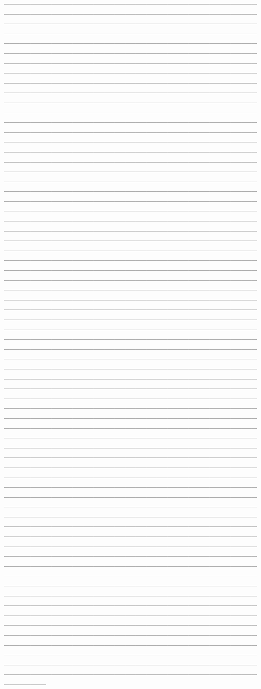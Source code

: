 \begin{itemize}
________________________________________________________________________________________________________________________________________________________________________________________________________________________________________________________________________________________________________________________________________________________________________________________________________________________________________________________________________________________________________________________________________________________________________________________________________________________________________________________________________________________________________________________________________________________________________________________________________________________________________________________________________________________________________________________________________________________________________________________________________________________________________________________________________________________________________________________________________________________________________________________________________________________________________________________________________________________________________________________________________________________________________________________________________________________________________________________________________________________________________________________________________________________________________________________________________________________________________________________________________________________________________________________________________________________________________________________________________________________________________________________________________________________________________________________________________________________________________________________________________________________________________________________________________________________________________________________________________________________________________________________________________________________________________________________________________________________________________________________________________________________________________________________________________________________________________________________________________________________________________________________________________________________________________________________________________________________________________________________________________________________________________________________________________________________________________________________________________________________________________________________________________________________________________________________________________________________________________________________________________________________________________________________________________________________________________________________________________________________________________________________________________________________________________________________________________________________________________________________________________________________________________________________________________________________________________________________
\end{itemize}
